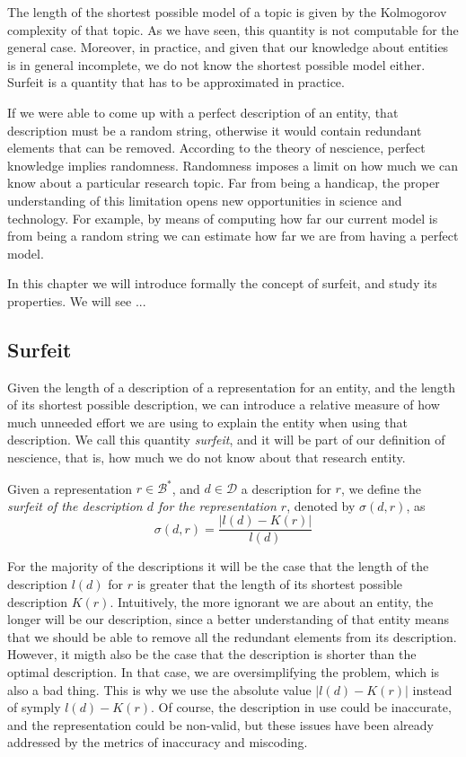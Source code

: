 The length of the shortest possible model of a topic is given by the Kolmogorov complexity of that topic. As we have seen, this quantity is not computable for the general case. Moreover, in practice, and given that our knowledge about entities is in general incomplete, we do not know the shortest possible model either. Surfeit is a quantity that has to be approximated in practice.

If we were able to come up with a perfect description of an entity, that description must be a random string, otherwise it would contain redundant elements that can be removed. According to the theory of nescience, perfect knowledge implies randomness. Randomness imposes a limit on how much we can know about a particular research topic. Far from being a handicap, the proper understanding of this limitation opens new opportunities in science and technology. For example, by means of computing how far our current model is from being a random string we can estimate how far we are from having a perfect model.

In this chapter we will introduce formally the concept of surfeit, and study its properties. We will see ...

%
%

\subsection{Surfeit}
\label{sec:Definition_redundancy}

Given the length of a description of a representation for an entity, and the length of its shortest possible description, we can introduce a relative measure of how much unneeded effort we are using to explain the entity when using that description. We call this quantity \emph{surfeit}, and it will be part of our definition of nescience, that is, how much we do not know about that research entity.

\begin{definition}[Surfeit]
Given a representation $r \in \mathcal{B}^\ast$, and $d \in \mathcal{D}$ a description for $r$, we define the \emph{surfeit of the description $d$ for the representation $r$}, denoted by $\sigma(d, r)$, as
\[
\sigma (d, r) = \frac{ | l(d) - K(r) |}{l(d)}
\]
\end{definition}

For the majority of the descriptions it will be the case that the length of the description $l(d)$ for $r$ is greater that the length of its shortest possible description $K(r)$. Intuitively, the more ignorant we are about an entity, the longer will be our description, since a better understanding of that entity means that we should be able to remove all the redundant elements from its description. However, it migth also be the case that the description is shorter than the optimal description. In that case, we are oversimplifying the problem, which is also a bad thing. This is why we use the absolute value $| l(d) - K(r) |$ instead of symply $l(d) - K(r)$. Of course, the description in use could be inaccurate, and the representation could be non-valid, but these issues have been already addressed by the metrics of inaccuracy and miscoding.

